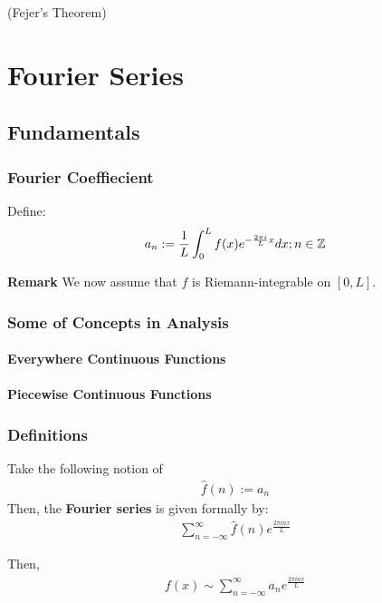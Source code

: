\documentclass[Total.tex]{subfiles}
\begin{document}
			\begin{theorem}
				(Fejer's Theorem)
			\end{theorem}
	\chapter{Fourier Series}
		\section{Fundamentals}
			\subsection{Fourier Coeffiecient}
				\begin{Def}
					Define:
					\begin{gather*}
						a_n:=\frac{1}{L}\int_0^L f(x)e^{-\frac{2\pi i}{L}x}dx;n\in \mathbb{Z}
					\end{gather*}
				\end{Def}
				\textbf{Remark} We now assume that $f$ is Riemann-integrable on $[0,L]$. 
			\subsection{Some of Concepts in Analysis}
				\subsubsection{Everywhere Continuous Functions}
				\subsubsection{Piecewise Continuous Functions}
			\subsection{Definitions}
				\begin{Def}
					Take the following notion of
					\begin{gather*}
						\hat{f}(n):=a_n
					\end{gather*}
					Then, the \textbf{Fourier series} is given formally by:
					\begin{gather*}
						\sum_{n=-\infty}^\infty \hat{f}(n)e^{\frac{2\pi inx}{L}}
					\end{gather*}
				\end{Def}
				Then, 
				\begin{gather*}
					f(x)\sim \sum_{n=-\infty}^\infty a_n e^{\frac{2\pi inx}{L}}
				\end{gather*}
				
\end{document}
